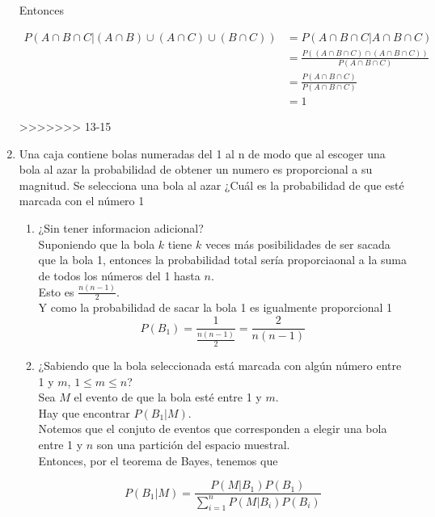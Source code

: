 \documentclass[12pt,a4paper]{report}
\begin{document}
\begin{enumerate}
{\begin{enumerate}[label=\alph*) ]
{			Entonces

			\begin{align*}
				P(A\cap B\cap C| (A\cap B) \cup (A\cap C) \cup (B\cap C)) &= P(A\cap B\cap C | A\cap B\cap C)\\
																																	&= \frac{P((A\cap B\cap C) \cap (A\cap B\cap C))}{P(A\cap B\cap C)}\\
																																	&= \frac{P(A\cap B\cap C)}{P(A\cap B\cap C)}\\
																																	&= 1
			\end{align*}
		 }
		 \end{enumerate}
>>>>>>> 13-15
  }


  \item{
 Una caja contiene bolas numeradas del 1 al n de modo que al escoger una bola al azar la probabilidad de obtener un numero es proporcional a su magnitud. Se selecciona una bola al azar ¿Cuál es la probabilidad de que esté marcada con el número 1\\
 \begin{enumerate}[label= \alph*) ]
 \item{
	 	¿Sin tener informacion adicional?\\
		Suponiendo que la bola $k$ tiene $k$ veces más posibilidades de ser sacada que la bola 1,
		entonces la probabilidad total sería proporciaonal a la suma de todos los números del 1 hasta $n$.\\
		Esto es $\frac{n(n-1)}{2}$.\\
		Y como la probabilidad de sacar la bola 1 es igualmente  proporcional 1
		\begin{equation*}
			P(B_1) = \frac{1}{\frac{n(n-1)}{2}} = \frac{2}{n(n-1)}
		\end{equation*}
	}
 \item{
	 	¿Sabiendo que la bola seleccionada está marcada con algún número entre 1 y $m$, $1\leq m \leq n$?\\
		Sea $M$ el evento de que la bola esté entre 1 y $m$.\\
		Hay que encontrar $P(B_1|M)$.\\
		Notemos que el conjuto de eventos que corresponden a elegir una bola entre 1 y $n$
		son una partición del espacio muestral.\\
		Entonces, por el teorema de Bayes, tenemos que

			\[P(B_1|M) = \frac{P(M | B_1)P(B_1)}{\sum_{i = 1}^n P(M|B_i)P(B_i)}\]

}
\end{enumerate}}
\end{enumerate}
\end{document}
